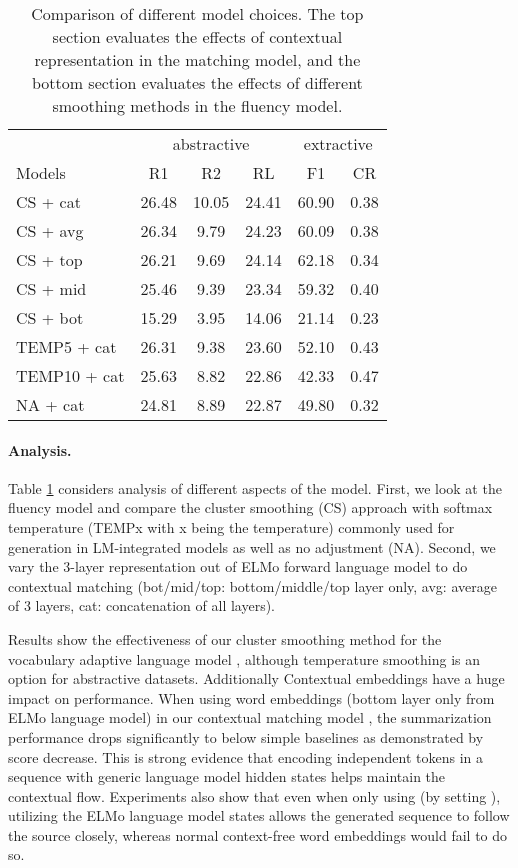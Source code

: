 \documentclass[11pt,a4paper]{article}
\begin{document}
\begin{table}[t!]
\small
\begin{center}
\begin{tabular}{l ccc cc}
\toprule
 & \multicolumn{3}{c}{abstractive} & \multicolumn{2}{c}{extractive}\\
Models & R1 & R2 & RL & F1 & CR \\ 
\midrule
CS + cat & 26.48 & 10.05 & 24.41 & 60.90 & 0.38\\
CS + avg & 26.34 & 9.79 & 24.23 & 60.09 & 0.38\\
CS + top & 26.21 & 9.69 & 24.14 & 62.18 & 0.34\\
CS + mid & 25.46 & 9.39 & 23.34 & 59.32 & 0.40\\
CS + bot & 15.29 & 3.95 & 14.06 & 21.14 & 0.23\\
\midrule
TEMP5 + cat & 26.31 & 9.38 & 23.60 & 52.10 & 0.43\\
TEMP10 + cat & 25.63 & 8.82 & 22.86 & 42.33 & 0.47\\
NA + cat & 24.81 & 8.89  & 22.87 & 49.80 & 0.32\\
\bottomrule
\end{tabular}
\end{center}
\caption{Comparison of different model choices. The top section evaluates the effects of contextual representation in the matching model, and the bottom section evaluates the effects of different smoothing methods in the fluency model.}
\label{table:analysis}
\end{table}


\paragraph{Analysis.}
Table \ref{table:analysis} considers analysis of different aspects of the model. First, we look at the 
fluency model and compare the cluster smoothing (CS) approach with softmax temperature (TEMPx with x being the temperature) commonly used for generation in LM-integrated models \cite{chorowski2016towards} as well as no adjustment (NA). Second, we vary the 3-layer representation out of ELMo forward language model to do contextual matching (bot/mid/top: bottom/middle/top layer only, avg: average of 3 layers, cat: concatenation of all layers). 

Results show the effectiveness of our cluster smoothing method for the vocabulary adaptive language model , although temperature smoothing is an option for abstractive datasets. Additionally Contextual embeddings have a huge impact on performance. 
 When using word embeddings (bottom layer only from ELMo language model) in our contextual matching model , the summarization performance drops significantly to below simple baselines as demonstrated by score decrease. This is strong evidence that encoding independent tokens in a sequence with generic language model hidden states helps maintain the contextual flow. 
 Experiments also show that even when only using  (by setting ), utilizing the ELMo language model states allows the generated sequence to follow the source  closely, whereas normal context-free word embeddings would fail to do so.
\end{document}
